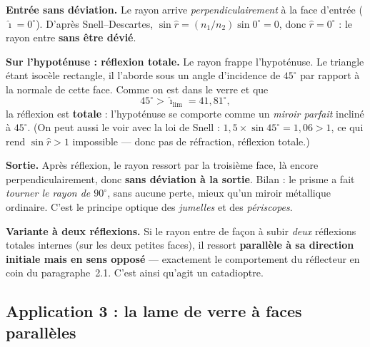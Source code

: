 \documentclass[11pt,a4paper]{article}
\newcommand{\angi}{\hat{\imath}}     %
\newcommand{\angr}{\hat{r}}          %
\begin{document}
\begin{exemple}
\textbf{Entrée sans déviation.} Le rayon arrive \emph{perpendiculairement} à la face d'entrée
($\angi = 0^\circ$). D'après Snell–Descartes, $\sin\angr = (n_1/n_2)\sin 0^\circ = 0$, donc
$\angr = 0^\circ$ : le rayon entre \textbf{sans être dévié}.

\smallskip
\textbf{Sur l'hypoténuse : réflexion totale.} Le rayon frappe l'hypoténuse. Le triangle étant
isocèle rectangle, il l'aborde sous un angle d'incidence de $45^\circ$ par rapport à la normale de
cette face. Comme on est dans le verre et que
\[ 45^\circ > \angi_{\text{lim}} = 41{,}81^\circ, \]
la réflexion est \textbf{totale} : l'hypoténuse se comporte comme un \emph{miroir parfait} incliné à
$45^\circ$. (On peut aussi le voir avec la loi de Snell : $1{,}5 \times \sin 45^\circ = 1{,}06 > 1$,
ce qui rend $\sin\angr > 1$ impossible — donc pas de réfraction, réflexion totale.)

\smallskip
\textbf{Sortie.} Après réflexion, le rayon ressort par la troisième face, là encore
perpendiculairement, donc \textbf{sans déviation à la sortie}. Bilan : le prisme a fait
\emph{tourner le rayon de $90^\circ$}, sans aucune perte, mieux qu'un miroir métallique ordinaire.
C'est le principe optique des \emph{jumelles} et des \emph{périscopes}.

\smallskip
\textbf{Variante à deux réflexions.} Si le rayon entre de façon à subir \emph{deux} réflexions
totales internes (sur les deux petites faces), il ressort \textbf{parallèle à sa direction initiale
mais en sens opposé} — exactement le comportement du réflecteur en coin du paragraphe~2.1. C'est
ainsi qu'agit un catadioptre.
\end{exemple}

\subsection{Application 3 : la lame de verre à faces parallèles}
\end{document}

